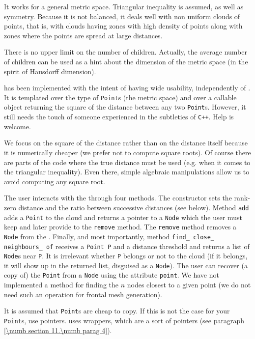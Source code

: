 It works for a general metric space.
Triangular inequality is assumed, as well as symmetry.
Because it is not balanced, it deals well with non uniform clouds of points, that is,
with clouds having zones with
high density of points along with zones where the points are spread at large distances.

There is no upper limit on the number of children.
Actually, the average number of children can be used as a hint about the dimension of the
metric space (in the spirit of Hausdorff dimension).

{\small\tt {}} has been implemented with the intent of having wide usability,
independently of \maniFEM.
It is templated over the type of {\small\tt Point}s (the metric space) and over a callable
object returning the square of the distance between any two {\small\tt Point}s.
However, it still needs the touch of someone experienced in the subtleties of {\tt C++}.
Help is welcome.

We focus on the square of the distance rather than on the distance itself because it
is numerically cheaper (we prefer not to compute square roots).
Of course there are parts of the code where the true distance must be used
(e.g. when it comes to the triangular inequality).
Even there, simple algebraic manipulations allow us to avoid computing any square root.

The user interacts with the {\small\tt{}} through four methods.
The constructor sets the rank-zero distance and the ratio between successive
distances (see below).
Method {\small\tt add} adds a {\small\tt Point} to the cloud and returns a pointer to a
{\small\tt Node} which the user must keep and later provide to the {\small\tt remove} method.
The {\small\tt remove} method removes a {\small\tt Node} from the {\small\tt{}}.
Finally, and most importantly, method {\small\tt find\_\,close\_\,neighbours\_\,of} receives a
{\small\tt Point P} and a distance threshold and returns a list of {\small\tt Node}s near
{\small\tt P}.
It is irrelevant whether {\small\tt P} belongs or not to the cloud (if it belongs, it will
show up in the returned list, disguised as a {\small\tt Node}).
The user can recover (a copy of) the {\small\tt Point} from a {\small\tt Node} using the attribute
{\small\tt point}.
We have not implemented a method for finding the $n$ nodes closest to a given point
(we do not need such an operation for frontal mesh generation).

It is assumed that {\small\tt Point}s are cheap to copy.
If this is not the case for your {\small\tt Point}s, use pointers.
{\ManiFEM} uses wrappers, which are a sort of pointers (see paragraph
\ref{\numb section 11.\numb parag 4}).

